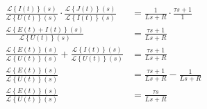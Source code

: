\documentclass{article}
\newcommand{\Laplace}[1]{\mathcal{L}\left\{#1\right\}(s)}
\begin{document}
\begin{align*}
    \frac{\Laplace{I(t)}}{\Laplace{U(t)}} \cdot \frac{\Laplace{J(t)}}{\Laplace{I(t)}} & = \frac{1}{Ls+R}  \cdot \frac{\tau s + 1}{1}\\
    \frac{\Laplace{E(t) + I(t)}}{\Laplace{U(t)}}  & = \frac{\tau s+1}{Ls+R}\\
    \frac{\Laplace{E(t)}}{\Laplace{U(t)}} + \frac{\Laplace{I(t)}}{\Laplace{U(t)}}  & = \frac{\tau s+1}{Ls+R}\\
    \frac{\Laplace{E(t)}}{\Laplace{U(t)}}   & = \frac{\tau s+1}{Ls+R} - \frac{1}{Ls+R}\\
    \frac{\Laplace{E(t)}}{\Laplace{U(t)}}   & = \frac{\tau s}{Ls+R}\\
\end{align*}
\end{document}
